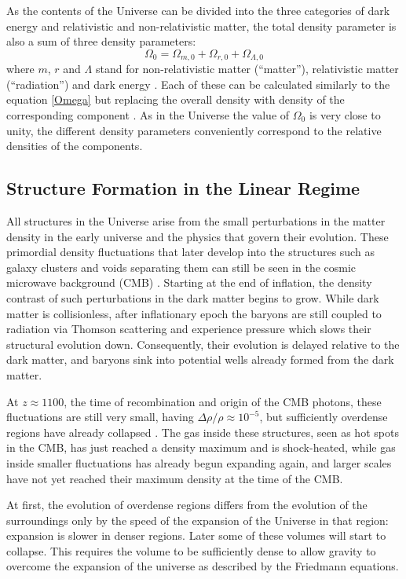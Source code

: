 \documentclass[english, twoside]{HYgradu}
\begin{document}
As the contents of the Universe can be divided into the three categories of dark energy and relativistic and non-relativistic matter, the total density parameter is also a sum of three density parameters:
\begin{equation}
\Omega_0 = \Omega_{m,0} + \Omega_{r, 0} + \Omega_{\Lambda, 0}
\end{equation}
where $m$, $r$ and $\Lambda$ stand for non-relativistic matter (``matter''), relativistic matter (``radiation'') and dark energy \citep{mo2010galaxy}. Each of these can be calculated similarly to the equation \ref{Omega} but replacing the overall density with density of the corresponding component \citep{mo2010galaxy}. As in the Universe the value of $\Omega_0$ is very close to unity, the different density parameters conveniently correspond to the relative densities of the components.


\subsection{Structure Formation in the Linear Regime} \label{universe-structure}
All structures in the Universe arise from the small perturbations in the matter density in the early universe and the physics that govern their evolution. These primordial density fluctuations that later develop into the structures such as galaxy clusters and voids separating them can still be seen in the cosmic microwave background (CMB) \citep{planck2016resultsI}. Starting at the end of inflation, the density contrast of such perturbations in the dark matter begins to grow. While dark matter is collisionless, after inflationary epoch the baryons are still coupled to radiation via Thomson scattering and experience pressure which slows their structural evolution down. Consequently, their evolution is delayed relative to the dark matter, and baryons sink into potential wells already formed from the dark matter.

At $z \approx 1100$, the time of recombination and origin of the CMB photons, these fluctuations are still very small, having $\Delta\rho/\rho \approx 10^{-5}$, but sufficiently overdense regions have already collapsed \citep{mo2010galaxy}. The gas inside these structures, seen as hot spots in the CMB, has just reached a density maximum and is shock-heated, while gas inside smaller fluctuations has already begun expanding again, and larger scales have not yet reached their maximum density at the time of the CMB.

At first, the evolution of overdense regions differs from the evolution of the surroundings only by the speed of the expansion of the Universe in that region: expansion is slower in denser regions. Later some of these volumes will start to collapse. This requires the volume to be sufficiently dense to allow gravity to overcome the expansion of the universe as described by the Friedmann equations.
\end{document}
